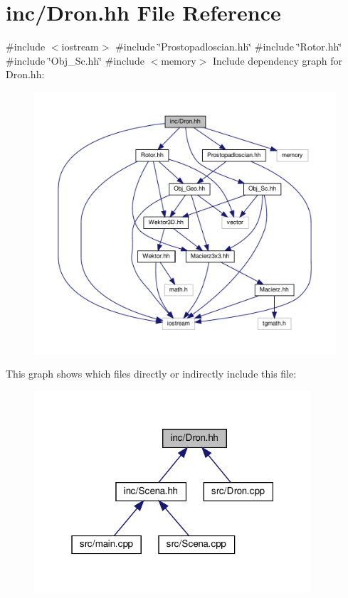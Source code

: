 \hypertarget{_dron_8hh}{}\section{inc/\+Dron.hh File Reference}
\label{_dron_8hh}
{\ttfamily \#include $<$iostream$>$}\newline
{\ttfamily \#include \char`\"{}Prostopadloscian.\+hh\char`\"{}}\newline
{\ttfamily \#include \char`\"{}Rotor.\+hh\char`\"{}}\newline
{\ttfamily \#include \char`\"{}Obj\+\_\+\+Sc.\+hh\char`\"{}}\newline
{\ttfamily \#include $<$memory$>$}\newline
Include dependency graph for Dron.\+hh\+:
\nopagebreak
\begin{figure}[H]
\begin{center}
\leavevmode
\includegraphics[width=350pt]{_dron_8hh__incl}
\end{center}
\end{figure}
This graph shows which files directly or indirectly include this file\+:
\nopagebreak
\begin{figure}[H]
\begin{center}
\leavevmode
\includegraphics[width=292pt]{_dron_8hh__dep__incl}
\end{center}
\end{figure}
